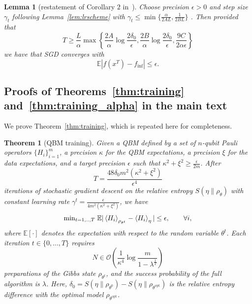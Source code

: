 \documentclass[
    aps,
    prx,
    floatfix,
    nofootinbib,
    onecolumn
]{revtex4-2}
\newtheorem{theorem}{Theorem}
\newtheorem{lemma}{Lemma}
\begin{document}
\begin{lemma}[restatement of Corollary $2$ in~\cite{Khaled2020}]
\label{lem:sgd_conv_2}
Choose precision $\epsilon > 0$ and step size $\gamma_t$ following Lemma~\ref{lem:lrscheme} with $\gamma_t\leq \min \{\frac{\alpha}{2AL}, \frac{1}{2BL}\}$ . Then provided that 
\begin{equation}
\label{eq:condition_1}
T \geq \frac{L}{\alpha} \max \left\{ \frac{2A}{\alpha}\log{\frac{2\delta_0}{\epsilon}}, \frac{2B}{\alpha}\log{\frac{2\delta_0}{\epsilon}}, \frac{9C}{2\alpha \epsilon} \right\}
\end{equation} 
we have that SGD converges with 
\begin{equation}
 \mathbb{E} |f(x^T)-f_{\mathrm{inf}} | \leq \epsilon .
\end{equation}
\end{lemma}


\subsection{Proofs of Theorems~\ref{thm:training} and~\ref{thm:training_alpha} in the main text}
\label{app:proofsthm12}

We prove Theorem~\ref{thm:training}, which is repeated here for completeness. 

\begingroup
\def\thetheorem{1}
\begin{theorem}[QBM training]
Given a QBM defined by a set of $n$-qubit Pauli operators $\{H_i\}_{i=1}^m$, a precision $\kappa$ for the QBM expectations, a precision $\xi$ for the data expectations, and a target precision $\epsilon$ such that $\kappa^2 + \xi^2 \geq \frac{\epsilon}{2m}$. After 
\begin{equation}
    T = \frac{48\delta_0 m^2  (\kappa^2 + \xi^2 )}{\epsilon^4}
\end{equation} 
iterations of stochastic gradient descent on the relative entropy $S(\eta \|\rho_\theta)$ with constant learning rate $\gamma^t=\frac{\epsilon}{4m^2(\kappa^2+\xi^2)}$, we have
\begin{equation}
    \mathrm{min}_{t=1,..,T} \; \mathbb{E}| \expval{H_i}_{\rho_{\theta^t}}  - \expval{H_i}_\eta | \leq \epsilon, \qquad \forall i,
\end{equation} where $\mathbb{E}[\cdot]$ denotes the expectation with respect to the random variable $\theta^t$. 
Each iteration $t \in \{0, \dots, T\}$ requires
\begin{equation}
\label{eq:copies_app}
    N \in \mathcal{O} \left( \frac{1}{{\kappa^4}} \log \frac{ m} { 1-\lambda^{\frac{1}{T}} } \right)
\end{equation}
preparations of the Gibbs state $\rho_{\theta^t}$, and the success probability of the full algorithm is $\lambda$. Here, $\delta_0 = S(\eta\|\rho_{\theta^0})-S(\eta\|\rho_{\theta^\mathrm{opt}})$ is the relative entropy difference with the optimal model $\rho_{\theta^\mathrm{opt}}$.
\end{theorem}
\addtocounter{theorem}{-1}
\endgroup
\end{document}
